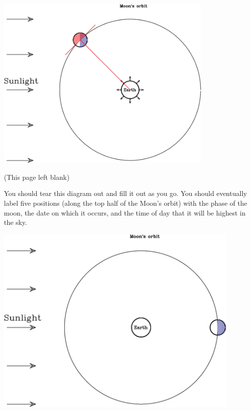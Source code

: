 \documentclass[11pt]{article}
\begin{document}
\begin{center}
	\includegraphics[width=0.8\textwidth]{allpositions-crop.pdf}
\end{center}

\newpage
\begin{center}
(This page left blank)
\end{center}

\newpage

You should tear this diagram out and fill it out as you go. You should eventually label five positions (along the top half of the Moon's orbit)
with the phase of the moon, the date on which it occurs, and the time of day that it will be highest in the sky.

\includegraphics[width=0.9\textwidth]{moon-diagram-full-shade.pdf}
\end{document}
